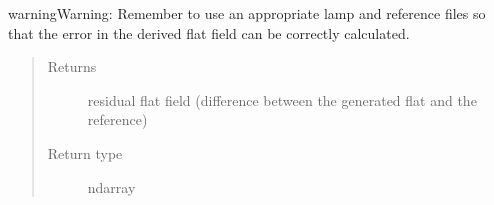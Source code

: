 \documentclass[a4paper,11pt,english]{sphinxmanual}
\begin{document}
\begin{fulllineitems}
\begin{quote}
\begin{description}
\end{description}\end{quote}

\begin{notice}{warning}{Warning:}
Remember to use an appropriate lamp and reference files so that the error in the derived
flat field can be correctly calculated.
\end{notice}
\begin{quote}\begin{description}
\item[{Returns}] \leavevmode
residual flat field (difference between the generated flat and the reference)

\item[{Return type}] \leavevmode
ndarray

\end{description}\end{quote}

\end{fulllineitems}

\end{document}
